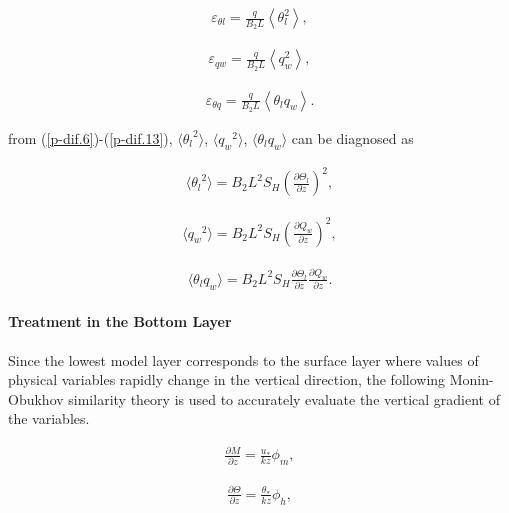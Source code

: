 \begin{eqnarray}
\varepsilon_{\theta l}=\frac{q}{B_{2} L}\left\langle\theta_{l}^{2}\right\rangle \label{p-dif.11},
\end{eqnarray}

\begin{eqnarray}
\varepsilon_{q w}=\frac{q}{B_{2} L}\left\langle q_{w}^{2}\right\rangle \label{p-dif.12},
\end{eqnarray}

\begin{eqnarray}
\varepsilon_{\theta q}=\frac{q}{B_{2} L}\left\langle\theta_{l} q_{w}\right\rangle \label{p-dif.13}.
\end{eqnarray}

from (\ref{p-dif.6})-(\ref{p-dif.13}),
\(\langle {\theta_l}^2 \rangle\), \(\langle {q_w}^2 \rangle\),
\(\langle \theta_l q_w \rangle\) can be diagnosed as

\begin{eqnarray}\langle {\theta_l}^2 \rangle =B_2L^2S_H\left(\frac{\partial \Theta_l}{\partial z}\right)^2,\end{eqnarray}

\begin{eqnarray}\langle {q_w}^2 \rangle =B_2L^2S_H\left(\frac{\partial Q_w}{\partial z}\right)^2,\end{eqnarray}

\begin{eqnarray}\langle \theta_l q_w \rangle =B_2L^2S_H\frac{\partial \Theta_l}{\partial z}\frac{\partial Q_w}{\partial z}.\end{eqnarray}

\hypertarget{treatment-in-the-bottom-layer}{%
\paragraph{Treatment in the Bottom
Layer}\label{treatment-in-the-bottom-layer}}

Since the lowest model layer corresponds to the surface layer where
values of physical variables rapidly change in the vertical direction,
the following Monin-Obukhov similarity theory is used to accurately
evaluate the vertical gradient of the variables.

\begin{eqnarray} \frac{\partial M}{\partial z} = \frac{u_*}{kz}\phi_m \label{p-dif.14},\end{eqnarray}

\begin{eqnarray} \frac{\partial \Theta}{\partial z} = \frac{\theta_*}{kz}\phi_h \label{p-dif.15},\end{eqnarray}

